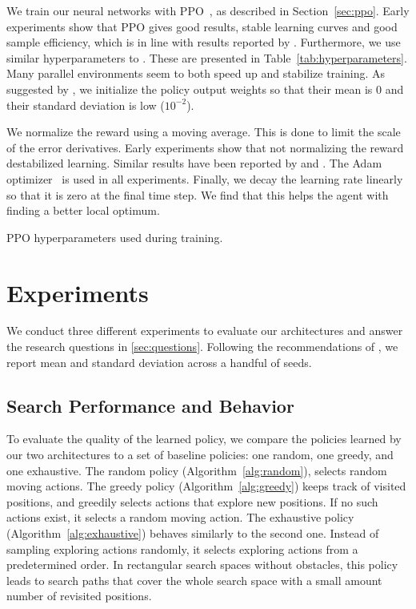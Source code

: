 We train our neural networks with PPO~\cite{schulman_proximal_2017}, as described in Section~\ref{sec:ppo}.
Early experiments show that PPO gives good results, stable learning curves and good sample efficiency, which is in line with results reported by \cite{andrychowicz_what_2020}.
Furthermore, we use similar hyperparameters to \cite{cobbe_leveraging_2020}.
These are presented in Table~\ref{tab:hyperparameters}.
Many parallel environments seem to both speed up and stabilize training. 
As suggested by \cite{andrychowicz_what_2020}, we initialize the policy output weights so that their mean is 0 and their standard deviation is low (\(10^{-2}\)).

We normalize the reward using a moving average.
This is done to limit the scale of the error derivatives.
Early experiments show that not normalizing the reward destabilized learning. %
Similar results have been reported by \cite{andrychowicz_what_2020} and \cite{mnih_playing_2013}.
The Adam optimizer~\cite{kingma_adam_2017} is used in all experiments.
Finally, we decay the learning rate linearly so that it is zero at the final time step.
We find that this helps the agent with finding a better local optimum.

\begin{table}
    \centering
    \caption[PPO hyperparameters]{PPO hyperparameters used during training.}
    
    \label{tab:hyperparameters}
\end{table}

\section{Experiments}
\label{sec:experiments}

We conduct three different experiments to evaluate our architectures and answer the research questions in \ref{sec:questions}. 
Following the recommendations of \cite{henderson_deep_2018,colas_hitchhikers_2019,agarwal_deep_2022}, we report mean and standard deviation across a handful of seeds.

\subsection{Search Performance and Behavior}

To evaluate the quality of the learned policy, we compare the policies learned by our two architectures to a set of baseline policies: 
one random, one greedy, and one exhaustive.
The random policy (Algorithm~\ref{alg:random}), selects random moving actions.
The greedy policy (Algorithm~\ref{alg:greedy}) keeps track of visited positions, and greedily selects actions that explore new positions.
If no such actions exist, it selects a random moving action.
The exhaustive policy (Algorithm~\ref{alg:exhaustive}) behaves similarly to the second one.
Instead of sampling exploring actions randomly, it selects exploring actions from a predetermined order.
In rectangular search spaces without obstacles, this policy leads to search paths that cover the whole search space with a small amount number of revisited positions.

